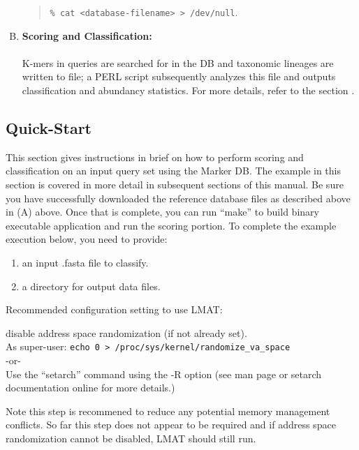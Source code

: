 \documentclass[11pt]{article}
\begin{document}
\begin{enumerate}[A.]
{\begin{quote}
 \texttt{\% cat <database-filename> > /dev/null}.
\end{quote}

}
  \item
{


  {\bf Scoring and Classification:}\\
  \\
   K-mers in queries are searched for in the DB
     and taxonomic lineages are written to file; a PERL script subsequently
     analyzes this file and outputs classification and abundancy statistics.  For more details, refer to the section .
}
\end{enumerate}

\subsection{Quick-Start}
\label{sec:quick-start}

This section gives instructions in brief on how to perform scoring and classification on an input query set using the Marker DB.  The example in this section is covered in more detail in subsequent sections of this manual.   Be sure you have successfully downloaded the reference database files as described above in  (A) above. Once that is complete, you can run ``make'' to build binary executable application and run the scoring portion.  To complete the example execution below, you need to provide: 

\begin{enumerate}[(1)]
\item 
{
 an input .fasta file to classify. 
 }
 \item
{ 
 a directory for output data files.
 }
\end{enumerate}


\noindent Recommended configuration setting to use LMAT: 

 disable address space randomization (if not already set).\\
   As super-user: \texttt{echo 0 > /proc/sys/kernel/randomize\_va\_space}\\
-or-\\
 Use the ``setarch'' command using the -R option (see man page or setarch documentation online for more details.)

Note this step is recommened to reduce any potential memory management conflicts. 
So far this step does not appear to be required and if address space randomization cannot be disabled, LMAT should 
still run.   
\end{document}
